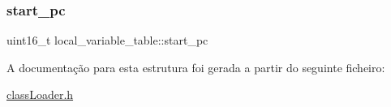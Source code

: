 \subsubsection{\texorpdfstring{start\+\_\+pc}{start\_pc}}
{\footnotesize\ttfamily uint16\+\_\+t local\+\_\+variable\+\_\+table\+::start\+\_\+pc}



A documentação para esta estrutura foi gerada a partir do seguinte ficheiro\+:\begin{DoxyCompactItemize}
\item 
\hyperlink{class_loader_8h}{class\+Loader.\+h}\end{DoxyCompactItemize}
